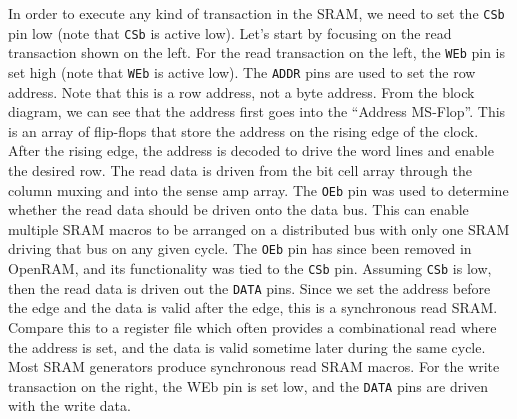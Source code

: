 \documentclass[a4paper,12pt,twoside]{article}
\begin{document}
In order to execute any kind of transaction in the SRAM, we need to set the \texttt{CSb} pin low (note that \texttt{CSb} is active low). Let’s start by focusing on the read transaction shown on the left. For the read transaction on the left, the \texttt{WEb} pin is set high (note that \texttt{WEb} is active low). The \texttt{ADDR} pins are used to set the row address. Note that this is a row address, not a byte address. From the block diagram, we can see that the address first goes into the “Address MS-Flop”. This is an array of flip-flops that store the address on the rising edge of the clock. After the rising edge, the address is decoded to drive the word lines and enable the desired row. The read data is driven from the bit cell array through the column muxing and into the sense amp array. The \texttt{OEb} pin was used to determine whether the read data should be driven onto the data bus. This can enable multiple SRAM macros to be arranged on a distributed bus with only one SRAM driving that bus on any given cycle. The \texttt{OEb} pin has since been removed in OpenRAM, and its functionality was tied to the \texttt{CSb} pin. Assuming \texttt{CSb} is low, then the read data is driven out the \texttt{DATA} pins. Since we set the address before the edge and the data is valid after the edge, this is a synchronous read SRAM. Compare this to a register file which often provides a combinational read where the address is set, and the data is valid sometime later during the same cycle. Most SRAM generators produce synchronous read SRAM macros. For the write transaction on the right, the WEb pin is set low, and the \texttt{DATA} pins are driven with the write data.
\end{document}

